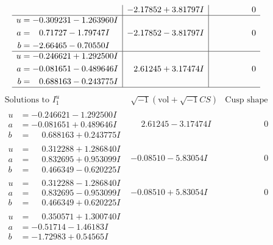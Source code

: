 \documentclass[1p]{elsarticle_modified}
\theoremstyle{definition}
\newcommand{\I}{\sqrt{-1}}
\begin{document}
$$\begin{array}{c|c|c}
 & -2.17852 + 3.81797 I & \phantom{-0.000000 } 0 \\ \hline\begin{aligned}
u &= -0.309231 - 1.263960 I \\
a &= \phantom{-}0.71727 - 1.79747 I \\
b &= -2.66465 - 0.70550 I\end{aligned}
 & -2.17852 - 3.81797 I & \phantom{-0.000000 } 0 \\ \hline\begin{aligned}
u &= -0.246621 + 1.292500 I \\
a &= -0.081651 - 0.489646 I \\
b &= \phantom{-}0.688163 - 0.243775 I\end{aligned}
 & \phantom{-}2.61245 + 3.17474 I & \phantom{-0.000000 } 0\\
 \hline 
 \end{array}$$\newpage$$\begin{array}{c|c|c}  
\text{Solutions to }I^u_{1}& \I (\text{vol} + \sqrt{-1}CS) & \text{Cusp shape}\\
 \hline 
\begin{aligned}
u &= -0.246621 - 1.292500 I \\
a &= -0.081651 + 0.489646 I \\
b &= \phantom{-}0.688163 + 0.243775 I\end{aligned}
 & \phantom{-}2.61245 - 3.17474 I & \phantom{-0.000000 } 0 \\ \hline\begin{aligned}
u &= \phantom{-}0.312288 + 1.286840 I \\
a &= \phantom{-}0.832695 + 0.953099 I \\
b &= \phantom{-}0.466349 - 0.620225 I\end{aligned}
 & -0.08510 - 5.83054 I & \phantom{-0.000000 } 0 \\ \hline\begin{aligned}
u &= \phantom{-}0.312288 - 1.286840 I \\
a &= \phantom{-}0.832695 - 0.953099 I \\
b &= \phantom{-}0.466349 + 0.620225 I\end{aligned}
 & -0.08510 + 5.83054 I & \phantom{-0.000000 } 0 \\ \hline\begin{aligned}
u &= \phantom{-}0.350571 + 1.300740 I \\
a &= -0.51714 - 1.46183 I \\
b &= -1.72983 + 0.54565 I\end{aligned}

\end{array}$$
\end{document}
